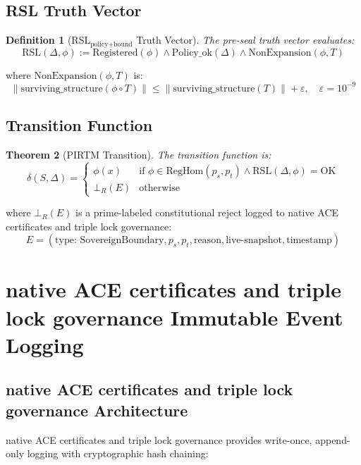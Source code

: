 \documentclass[11pt,a4paper]{article}
\newtheorem{theorem}{Theorem}[section]
\newtheorem{definition}[theorem]{Definition}
\begin{document}
\subsection{RSL Truth Vector}

\begin{definition}[RSL$_{\text{policy+bound}}$ Truth Vector]\label{def:rsl}
The pre-seal truth vector evaluates:
$$\text{RSL}(\Delta, \phi) := \text{Registered}(\phi) \land \text{Policy\_ok}(\Delta) \land \text{NonExpansion}(\phi, T)$$
\end{definition}

where $\text{NonExpansion}(\phi, T)$ is:
$$\|\text{surviving\_structure}(\phi \circ T)\| \leq \|\text{surviving\_structure}(T)\| + \varepsilon, \quad \varepsilon = 10^{-9}$$

\subsection{Transition Function}

\begin{theorem}[PIRTM Transition]\label{thm:transition}
The transition function is:
\begin{equation}\label{eq:transition}
\delta(S, \Delta) =
\begin{cases}
\phi(x) & \text{if } \phi \in \text{RegHom}(p_s, p_t) \land \text{RSL}(\Delta, \phi) = \text{OK} \\
\bot_R(E) & \text{otherwise}
\end{cases}
\end{equation}
\end{theorem}

where $\bot_R(E)$ is a prime-labeled constitutional reject logged to native ACE certificates and triple lock governance:
$$E = (\text{type: SovereignBoundary}, p_s, p_t, \text{reason}, \text{live-snapshot}, \text{timestamp})$$

\section{native ACE certificates and triple lock governance Immutable Event Logging}

\subsection{native ACE certificates and triple lock governance Architecture}

native ACE certificates and triple lock governance provides write-once, append-only logging with cryptographic hash chaining:
\end{document}

